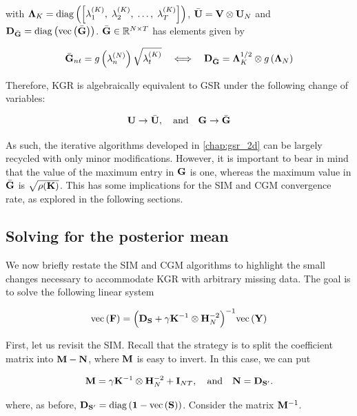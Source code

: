 with $\mathbf{\Lambda}_K = \text{\textup{diag}}\left(\left[\lambda^{(K)}_1, \; \lambda^{(K)}_2, \; \dots, \;\lambda^{(K)}_T \right]\right)$, $\bar{\mathbf{U}} = \mathbf{V} \otimes \mathbf{U}_N$ and $\mathbf{D}_{\bar{\mathbf{G}}} = \text{\textup{diag}}\left(\text{\textup{vec}}\left(\bar{\mathbf{G}}\right)\right)$. $\bar{\mathbf{G}} \in \mathbb{R}^{N \times T}$ has elements given by

\begin{equation}
    \bar{\mathbf{G}}_{nt} = g\left(\lambda^{(N)}_n\right) \sqrt{\lambda^{(K)}_t} \quad \Longleftrightarrow \quad \mathbf{D}_{\bar{\mathbf{G}}} = \mathbf{\Lambda}_K^{1/2} \otimes g\left(\mathbf{\Lambda}_N\right) 
\end{equation}



Therefore, KGR is algebraically equivalent to GSR under the following change of variables:

$$
\mathbf{U} \rightarrow \bar{\mathbf{U}}, \quad \text{and} \quad \mathbf{G} \rightarrow \bar{\mathbf{G}}
$$

As such, the iterative algorithms developed in \cref{chap:gsr_2d} can be largely recycled with only minor modifications. However, it is important to bear in mind that the value of the maximum entry in $\mathbf{G}$ is one, whereas the maximum value in $\bar{\mathbf{G}}$ is $\sqrt{\rho(\mathbf{K})}$. This has some implications for the SIM and CGM convergence rate, as explored in the following sections. 


 

\subsection{Solving for the posterior mean}

We now briefly restate the SIM and CGM algorithms to highlight the small changes necessary to accommodate KGR with arbitrary missing data. The goal is to solve the following linear system 

\begin{equation}
    \label{eq:lin_system_kgr}
    \text{\textup{vec}}\left(\mathbf{F}\right) = \Big(\mathbf{D}_{\mathbf{S}} + \gamma \mathbf{K}^{-1} \otimes \mathbf{H}_N^{-2}\Big)^{-1} \text{\textup{vec}}\left(\mathbf{Y}\right)
\end{equation}

First, let us revisit the SIM. Recall that the strategy is to split the coefficient matrix into $\mathbf{M} - \mathbf{N}$, where $\mathbf{M}$ is easy to invert. In this case, we can put

\begin{equation}
    \mathbf{M} = \gamma \mathbf{K}^{-1} \otimes \mathbf{H}_N^{-2} + \mathbf{I}_{NT}, \quad \text{and} \quad \mathbf{N} = \mathbf{D}_{\mathbf{S}'}.
\end{equation}

where, as before, $\mathbf{D}_{\mathbf{S}'} = \text{\textup{diag}}\left(\mathbf{1} - \text{\textup{vec}}\left(\mathbf{S}\right)\right)$. Consider the matrix $\mathbf{M}^{-1}$.

